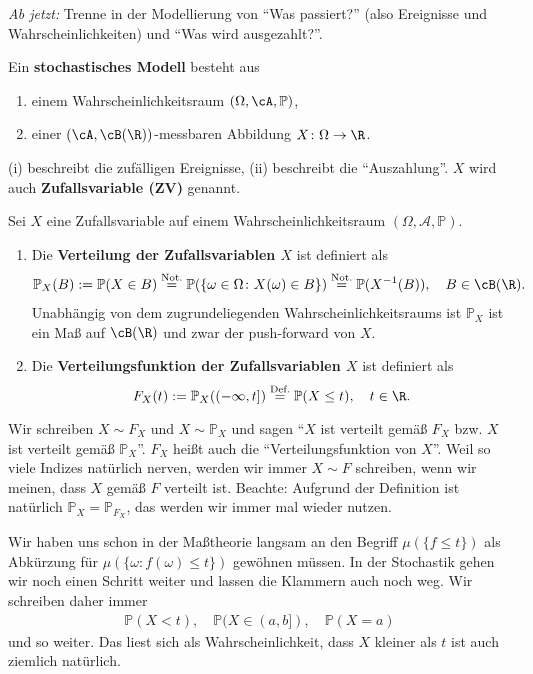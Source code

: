 \begin{disc}
 \textit{Ab jetzt:} Trenne in der Modellierung von \enquote{Was passiert?} (also Ereignisse und Wahrscheinlichkeiten) und \enquote{Was wird ausgezahlt?}.
\end{disc}

\begin{deff}
	Ein \textbf{stochastisches Modell} besteht aus
	\begin{enumerate}[label=(\roman*)]
		\item einem Wahrscheinlichkeitsraum $(\Omega, \cA, \mathbb{P})$,
		\item einer $(\cA, \cB(\R))$-messbaren Abbildung $X\colon \Omega \to \R$.
	\end{enumerate}
	(i) beschreibt die zufälligen Ereignisse, (ii) beschreibt die \enquote{Auszahlung}. $X$ wird auch \textbf{Zufallsvariable (ZV)} genannt.
\end{deff}

\begin{deff}
Sei $X$ eine Zufallsvariable auf einem Wahrscheinlichkeitsraum $(\Omega, \mathcal A, \mathbb P)$.
	\begin{enumerate}[label=(\roman*)]
		\item Die \textbf{Verteilung der Zufallsvariablen $X$} ist definiert als
		\begin{gather*}
			\mathbb{P}_X (B) := \mathbb{P} (X \in B) \overset{\text{Not.}}{=} \mathbb{P}(\{ \omega \in \Omega \colon X(\omega) \in B \}) \overset{\text{Not.}}{=} \mathbb{P}(X^{-1}(B)), \quad B \in \cB(\R).
		\end{gather*}
		Unabh\"angig von dem zugrundeliegenden Wahrscheinlichkeitsraums ist $ \mathbb{P}_X $ ist ein Maß auf $ \cB(\R) $ und zwar der push-forward von $X$.
		\item Die \textbf{Verteilungsfunktion der Zufallsvariablen $X$} ist definiert als
		\[ F_X(t) := \mathbb{P}_X((-\infty,t]) \overset{\text{Def.}}{=} \mathbb{P}(X \leq t), \quad t \in \R. \]
	\end{enumerate}
	Wir schreiben $X \sim F_X$ und $X \sim \mathbb{P}_X$ und sagen \enquote{$X$ ist verteilt gemäß $F_X$ bzw. $X$ ist verteilt gem\"a\ss{} $\mathbb P_X$}. $F_X$ hei\ss t auch die \enquote{Verteilungsfunktion von $X$}. Weil so viele Indizes nat\"urlich nerven, werden wir immer $X\sim F$ schreiben, wenn wir meinen, dass $X$ gem\"a\ss{} $F$ verteilt ist. Beachte: Aufgrund der Definition ist nat\"urlich $\mathbb P_X=\mathbb P_{F_X}$, das werden wir immer mal wieder nutzen.
\end{deff}

Wir haben uns schon in der Ma\ss theorie langsam an den Begriff $\mu(\{f\leq t\})$ als Abk\"urzung f\"ur $\mu(\{\omega: f(\omega)\leq t\})$ gew\"ohnen m\"ussen. In der Stochastik gehen wir noch einen Schritt weiter und lassen die Klammern auch noch weg. Wir schreiben daher immer 
\begin{align*}
	\mathbb P(X< t),\quad \mathbb P(X\in (a,b]),\quad \mathbb P(X=a)
\end{align*}
und so weiter. Das liest sich als \glqq Wahrscheinlichkeit, dass $X$ kleiner als $t$ ist\grqq{} auch ziemlich nat\"urlich.



